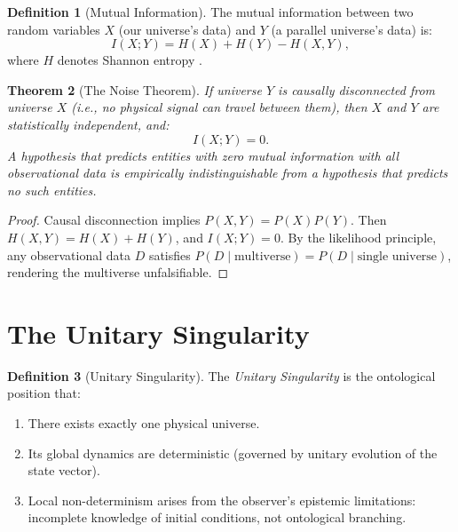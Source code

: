 \documentclass[12pt, a4paper]{article}
\theoremstyle{plain}
\newtheorem{theorem}{Theorem}[section]
\theoremstyle{definition}
\newtheorem{definition}[theorem]{Definition}
\begin{document}
\begin{definition}[Mutual Information]\label{def:mi}
  The mutual information between two random variables $X$ (our universe's
  data) and $Y$ (a parallel universe's data) is:
  \begin{equation}
    I(X; Y) = H(X) + H(Y) - H(X, Y),
  \end{equation}
  where $H$ denotes Shannon entropy \citep{Shannon1948, Cover2006}.
\end{definition}

\begin{theorem}[The Noise Theorem]\label{thm:noise}
  If universe $Y$ is causally disconnected from universe $X$ (i.e., no
  physical signal can travel between them), then $X$ and $Y$ are
  statistically independent, and:
  \begin{equation}
    I(X; Y) = 0.
  \end{equation}
  A hypothesis that predicts entities with zero mutual information with
  all observational data is empirically indistinguishable from a
  hypothesis that predicts no such entities.
\end{theorem}

\begin{proof}
  Causal disconnection implies $P(X, Y) = P(X) P(Y)$. Then
  $H(X, Y) = H(X) + H(Y)$, and $I(X; Y) = 0$. By the likelihood
  principle, any observational data $D$ satisfies
  $P(D \mid \text{multiverse}) = P(D \mid \text{single universe})$,
  rendering the multiverse unfalsifiable. \qedhere
\end{proof}

\section{The Unitary Singularity}\label{sec:unitary}

\begin{definition}[Unitary Singularity]\label{def:unitary}
  The \emph{Unitary Singularity} is the ontological position that:
  \begin{enumerate}[label=(\roman*)]
    \item There exists exactly one physical universe.
    \item Its global dynamics are deterministic (governed by unitary
      evolution of the state vector).
    \item Local non-determinism arises from the observer's epistemic
      limitations: incomplete knowledge of initial conditions, not
      ontological branching.
  \end{enumerate}
\end{definition}
\end{document}
